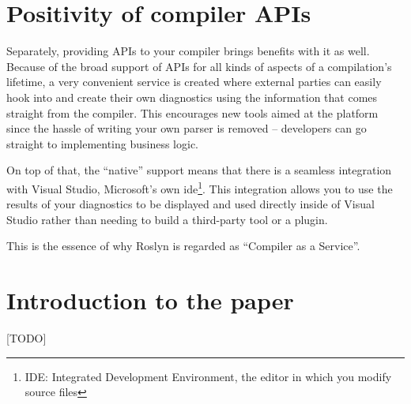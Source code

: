 \section{Positivity of compiler APIs}
\label{sec:intro-pos-api}

Separately, providing APIs to your compiler brings benefits with it as well. Because of the broad support of APIs for all kinds of aspects of a compilation’s lifetime, a very convenient service is created where external parties can easily hook into and create their own diagnostics using the information that comes straight from the \gls{compiler}. This encourages new tools aimed at the platform since the hassle of writing your own parser is removed – developers can go straight to implementing business logic. 

On top of that, the “native” support means that there is a seamless integration with Visual Studio, Microsoft’s own \gls{ide}\footnote{IDE: Integrated Development Environment, the editor in which you modify source files}. This integration allows you to use the results of your diagnostics to be displayed and used directly inside of Visual Studio rather than needing to build a third-party tool or a plugin.

\noindent This is the essence of why Roslyn is regarded as “Compiler as a Service”.



\section{Introduction to the paper}
\label{sec-intro-paper}

[TODO]